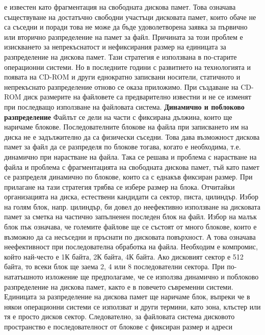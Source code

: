 \documentclass{article}
\begin{document}
е известен като фрагментация на свободната дискова памет. Това означава съществуване на достатъчно свободни участъци дисковата памет, които обаче
не са съседни и поради това не може да бъде удоволетворена заявка за първично или вторично разпределение на памет за файл. Причината за този проблем
е изискването за непрекъснатост и нефиксирания размер на единицата за разпределение на дискова памет. Тази стратегия е използвана в по-старите
операционни системи. Но в последните години с развитието на технологията и появата на CD-ROM и други еднократно записвани носители, статичното и
непрекъснато разпределение отново се оказа приложимо. При създаване на CD-ROM диск размерите на файловете са предварително известни и не се изменят
при последващо използване на файловата система. \newline\newline
\textbf{Динамично и поблоково разпределение} \newline\newline
Файлът се дели на части с фиксирана дължина, които ще наричаме блокове. Последователните блокове на файла при записването им на диска не е задължително
да са физически съседни. Това дава възможност дискова памет за файл да се разпределя по блокове тогава, когато е необходима, т.е. динамично при
нарастване на файла. Така се решава и проблема с нарастване на файла и проблема с фрагментацията на свободната дискова памет, тъй като памет се
разпределя динамично по блокове, които са с еднакъв фиксиран размер. При прилагане на тази стратегия трябва се избере размер на блока. Отчитайки
организацията на диска, естествени кандидати са сектор, писта, цилиндър. Избор на голям блок, напр. цилиндър, би довел до неефективно използване на
дисковата памет за сметка на частично запълненен последен блок на файл. Избор на малък блок пък означава, че големите файлове ще се състоят от много
блокове, които е възможно да са несъседни и пръснати по дисковата повърхност. А това означава неефективност при последователна обработка на файла.
Необходим е компромис, който най-често е 1К байта, 2К байта, 4К байта. Ако дисковият сектор е 512 байта, то всеки блок ще заема 2, 4 или 8 последователни
сектора. При по-нататъшното изложение ще предполагаме, че се използва динамично и поблоково разпределение на дискова памет, както е в повечето съвременни
системи. Единицата за разпределение на дискова памет ще наричаме блок, въпреки че в някои операционни системи се използват и други термини, като зона,
клъстер или тя е просто дисков сектор. Следователно, за файловата система дисковото пространство е последователност от блокове с фиксиран размер и адреси
\end{document}
